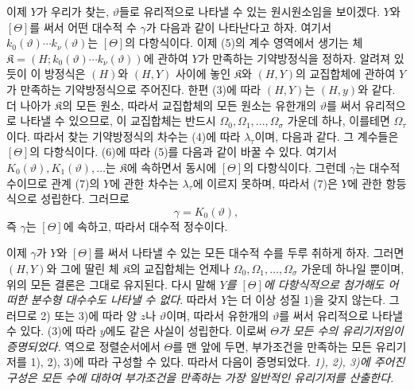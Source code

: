 이제 $Y$가 우리가 찾는, $\vartheta$들로 유리적으로 나타낼 수 있는 원시원소임을 보이겠다. $Y$와 $[\Theta]$를 써서 어떤 대수적 수 $\gamma$가 다음과 같이 나타난다고 하자.
여기서 $k_0(\vartheta)\cdots k_\nu(\vartheta)$는 $[\Theta]$의 다항식이다. 이제 (5)의 계수 영역에서 생기는 체
$\mathfrak K=(H;k_0(\vartheta)\cdots k_\nu(\vartheta))$에 관하여 $Y$가 만족하는 기약방정식을 정하자. 알려져 있듯이 이 방정식은 $(H)$와 $(H,Y)$ 사이에 놓인 $\mathfrak K$와 $(H,Y)$의 교집합체에 관하여 $Y$가 만족하는 기약방정식으로 주어진다. 한편 (3)에 따라 $(H,Y)$는 $(H,y)$와 같다. 더 나아가 $\mathfrak K$의 모든 원소, 따라서 교집합체의 모든 원소는 유한개의 $\vartheta$를 써서 유리적으로 나타낼 수 있으므로, 이 교집합체는 반드시 $\Omega_0,\Omega_1,\ldots,\Omega_\sigma$ 가운데 하나, 이를테면 $\Omega_\tau$이다. 따라서 찾는 기약방정식의 차수는 (4)에 따라 $\lambda_\tau$이며, 다음과 같다.
그 계수들은 $[\Theta]$의 다항식이다. (6)에 따라 (5)를 다음과 같이 바꿀 수 있다.
여기서 $K_0(\vartheta),K_1(\vartheta),\ldots$는 $\mathfrak K$에 속하면서 동시에 $[\Theta]$의 다항식이다. 그런데 $\gamma$는 대수적 수이므로 관계 (7)의 $Y$에 관한 차수는 $\lambda_\tau$에 이르지 못하며, 따라서 (7)은 $Y$에 관한 항등식으로 성립한다. 그러므로
\[
 \gamma=K_0(\vartheta),
\]
즉 $\gamma$는 $[\Theta]$에 속하고, 따라서 대수적 정수이다.

이제 $\gamma$가 $Y$와 $[\Theta]$를 써서 나타낼 수 있는 모든 대수적 수를 두루 취하게 하자. 그러면 $(H,Y)$와 그에 딸린 체 $\mathfrak K$의 교집합체는 언제나 $\Omega_0,\Omega_1,\ldots,\Omega_\sigma$ 가운데 하나일 뿐이며, 위의 모든 결론은 그대로 유지된다. 다시 말해 \emph{$Y$를 $[\Theta]$에 다항식적으로 첨가해도 어떠한 분수형 대수수도 나타낼 수 없다}. 따라서 $Y$는 더 이상 성질 1)을 갖지 않는다. 그러므로 2) 또는 3)에 따라 양 $z$나 $\vartheta$이며, 따라서 유한개의 $\vartheta$를 써서 유리적으로 나타낼 수 있다. (3)에 따라 $y$에도 같은 사실이 성립한다. 이로써 \emph{$\Theta$가 모든 수의 유리기저임이 증명되었다.} 역으로 정렬순서에서 $\Theta$를 맨 앞에 두면, 부가조건을 만족하는 모든 유리기저를 1), 2), 3)에 따라 구성할 수 있다. 따라서 다음이 증명되었다. \emph{1), 2), 3)에 주어진 구성은 모든 수에 대하여 부가조건을 만족하는 가장 일반적인 유리기저를 산출한다.}

